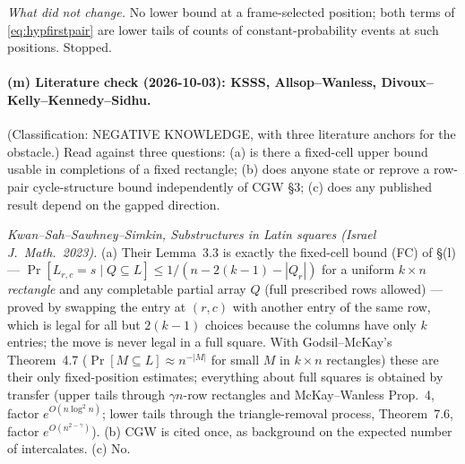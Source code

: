 \emph{What did not change.}  No lower bound at a frame-selected position;
both terms of \eqref{eq:hypfirstpair} are lower tails of counts of
constant-probability events at such positions.  Stopped.

\paragraph{(m) Literature check (2026-10-03): KSSS, Allsop--Wanless,
Divoux--Kelly--Kennedy--Sidhu.}  (Classification: NEGATIVE KNOWLEDGE,
with three literature anchors for the obstacle.)  Read against three
questions: (a) is there a fixed-cell upper bound usable in completions
of a fixed rectangle; (b) does anyone state or reprove a row-pair
cycle-structure bound independently of CGW \S3; (c) does any published
result depend on the gapped direction.

\emph{Kwan--Sah--Sawhney--Simkin, Substructures in Latin squares (Israel
J.\ Math.\ 2023).}  (a) Their Lemma~3.3 is exactly the fixed-cell bound
(FC) of \S(l) --- $\Pr[L_{r,c}=s\mid Q\subseteq L]\le1/(n-2(k-1)-|Q_r|)$
for a uniform $k\times n$ \emph{rectangle} and any completable partial
array $Q$ (full prescribed rows allowed) --- proved by swapping the
entry at $(r,c)$ with another entry of the same row, which is legal for
all but $2(k-1)$ choices because the columns have only $k$ entries; the
move is never legal in a full square.  With Godsil--McKay's Theorem~4.7
($\Pr[M\subseteq L]\approx n^{-|M|}$ for small $M$ in $k\times n$
rectangles) these are their only fixed-position estimates; everything
about full squares is obtained by transfer (upper tails through
$\gamma n$-row rectangles and McKay--Wanless Prop.~4, factor
$e^{O(n\log^2n)}$; lower tails through the triangle-removal process,
Theorem~7.6, factor $e^{O(n^{2-\gamma})}$).  (b) CGW is cited once, as
background on the expected number of intercalates.  (c) No.

